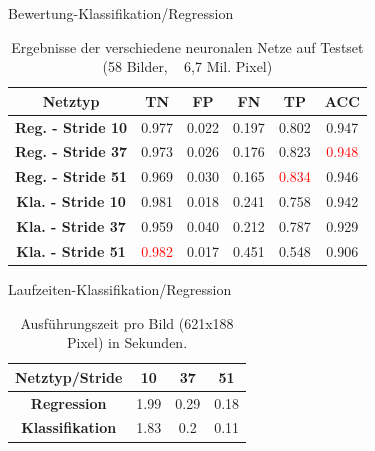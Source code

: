 \begin{frame}{Bewertung-Klassifikation/Regression}

      
      \begin{table}[h!]
  \begin{center}
    \label{tab:table1}
    \begin{tabular}{c|ccccc}
    \toprule
      \textbf{Netztyp} & \textbf{TN} & \textbf{FP} & \textbf{FN} & \textbf{TP} & \textbf{ACC} \\
       \midrule
      \textbf{Reg. - Stride 10} & 0.977 & 0.022 & 0.197 & 0.802 & 0.947\\
      \textbf{Reg. - Stride 37} & 0.973 & 0.026 & 0.176 & 0.823 &  \textcolor{red}{0.948}\\ 
      \textbf{Reg. - Stride 51} & 0.969 & 0.030 & 0.165 & \textcolor{red}{0.834} & 0.946\\
      \midrule
      \textbf{Kla. - Stride 10} & 0.981 & 0.018 & 0.241 & 0.758 & 0.942\\
      \textbf{Kla. - Stride 37} & 0.959 & 0.040 & 0.212 & 0.787 & 0.929\\
      \textbf{Kla. - Stride 51} & \textcolor{red}{0.982} & 0.017 & 0.451 & 0.548 & 0.906\\
      \bottomrule
    \end{tabular}
    \caption{Ergebnisse der verschiedene neuronalen Netze auf Testset (58 Bilder, ~ 6,7 Mil. Pixel)}
  \end{center}
\end{table}

\end{frame}

\begin{frame}{Laufzeiten-Klassifikation/Regression}

            \begin{table}[h!]
  \begin{center}

    \begin{tabular}{c|ccc}
    \toprule
      \textbf{Netztyp/Stride} & \textbf{10} & \textbf{37} & \textbf{51} \\
     \midrule
      \textbf{Regression} & 1.99 & 0.29 & 0.18 \\
      \textbf{Klassifikation} & 1.83 & 0.2 & 0.11\\
      \bottomrule
    \end{tabular}
        \caption{Ausf\"uhrungszeit pro Bild (621x188 Pixel) in Sekunden.}
  \end{center}
\end{table}

\end{frame}

